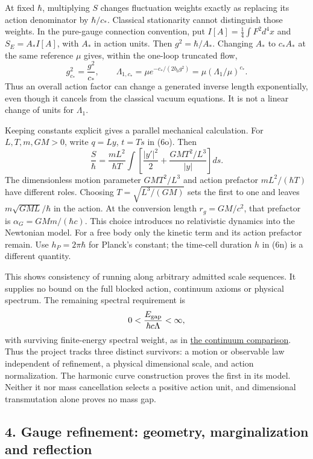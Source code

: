 \documentclass[11pt,a4paper]{article}
\begin{document}
At fixed \(\hbar\), multiplying \(S\) changes fluctuation weights
exactly as replacing its action denominator by \(\hbar/c_*\). Classical
stationarity cannot distinguish those weights. In the pure-gauge
connection convention, put \(I[A]=\frac14\int F^2d^4x\) and
\(S_E=A_*I[A]\), with \(A_*\) in action units. Then \(g^2=\hbar/A_*\).
Changing \(A_*\) to \(c_*A_*\) at the same reference \(\mu\) gives,
within the one-loop truncated flow, \[g_{c_*}^2=\frac{g^2}{c_*},\qquad
\Lambda_{1,c_*}=\mu e^{-c_*/(2b_0g^2)}
              =\mu(\Lambda_1/\mu)^{c_*}.\tag{6r}\] Thus an overall
action factor can change a generated inverse length exponentially, even
though it cancels from the classical vacuum equations. It is not a
linear change of units for \(\Lambda_1\).

Keeping constants explicit gives a parallel mechanical calculation. For
\(L,T,m,GM>0\), write \(q=Ly\), \(t=Ts\) in (6o). Then
\[\frac{S}{\hbar}=\frac{mL^2}{\hbar T}
 \int\left[\frac{|y'|^2}2+
                  \frac{GMT^2/L^3}{|y|}\right]ds.\] The dimensionless
motion parameter \(GMT^2/L^3\) and action prefactor \(mL^2/(\hbar T)\)
have different roles. Choosing \(T=\sqrt{L^3/(GM)}\) sets the first to
one and leaves \(m\sqrt{GML}/\hbar\) in the action. At the conversion
length \(r_g=GM/c^2\), that prefactor is \(\alpha_G=GMm/(\hbar c)\).
This choice introduces no relativistic dynamics into the Newtonian
model. For a free body only the kinetic term and its action prefactor
remain. Use \(h_P=2\pi\hbar\) for Planck's constant; the time-cell
duration \(h\) in (6n) is a different quantity.

This shows consistency of running along arbitrary admitted scale
sequences. It supplies no bound on the full blocked action, continuum
axioms or physical spectrum. The remaining spectral requirement is
\[0<\frac{E_{\rm gap}}{\hbar c\Lambda}<\infty,\] with surviving
finite-energy spectral weight, as in
\href{three-continuum-limits.md}{the continuum comparison}. Thus the
project tracks three distinct survivors: a motion or observable law
independent of refinement, a physical dimensional scale, and action
normalization. The harmonic curve construction proves the first in its
model. Neither it nor mass cancellation selects a positive action unit,
and dimensional transmutation alone proves no mass gap.

\hypertarget{gauge-refinement-geometry-marginalization-and-reflection}{%
\subsection{4. Gauge refinement: geometry, marginalization and
reflection}\label{gauge-refinement-geometry-marginalization-and-reflection}}
\end{document}
